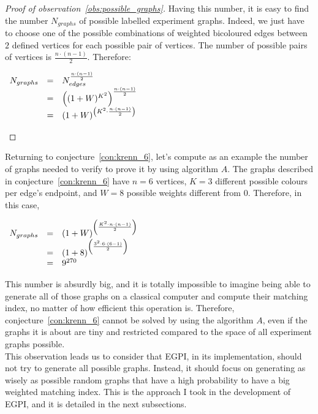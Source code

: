 \begin{proof}[Proof of observation~\ref{obs:possible_graphs}]
    Having this number, it is easy to find the number $N_{graphs}$ of possible labelled experiment graphs.
    Indeed, we just have to choose one of the possible combinations of weighted bicoloured edges between $2$ defined vertices for each possible pair of vertices.
    The number of possible pairs of vertices is $\frac{n \cdot (n-1)}{2}$.
    Therefore:

    \begin{center}
        $\begin{array}{r c l}
             N_{graphs} & = & N_{edges} ^ {\frac{n \cdot (n-1)}{2}}                  \\
                        & = & \left((1 + W)^{K^2}\right)^{\frac{n \cdot (n-1)}{2}}   \\
                        & = & (1 + W)^{\left({K^2} \cdot \frac{n \cdot (n-1)}{2}\right)} \\
        \end{array}$
    \end{center}
\end{proof}

Returning to conjecture~\ref{con:krenn_6}, let's compute as an example the number of graphs needed to verify to prove it by using algorithm $A$.
The graphs described in conjecture~\ref{con:krenn_6} have $n = 6$ vertices, $K = 3$ different possible colours per edge's endpoint, and $W = 8$ possible weights different from $0$.
Therefore, in this case,

\begin{center}
    $\begin{array}{r c l}
         N_{graphs} & = & (1 + W)^{\left(\frac{K^2 \cdot n \cdot (n-1)}{2}\right)} \\
                    & = & (1 + 8)^{\left(\frac{3^2 \cdot 6 \cdot (6-1)}{2}\right)} \\
                    & = & 9^{270}
    \end{array}$
\end{center}

This number is absurdly big, and it is totally impossible to imagine being able to generate all of those graphs on a classical computer and compute their matching index, no matter of how efficient this operation is.
Therefore, conjecture~\ref{con:krenn_6} cannot be solved by using the algorithm $A$, even if the graphs it is about are tiny and restricted compared to the space of all experiment graphs possible.\\

This observation leads us to consider that EGPI, in its implementation, should not try to generate all possible graphs.
Instead, it should focus on generating as wisely as possible random graphs that have a high probability to have a big weighted matching index.
This is the approach I took in the development of EGPI, and it is detailed in the next subsections.


